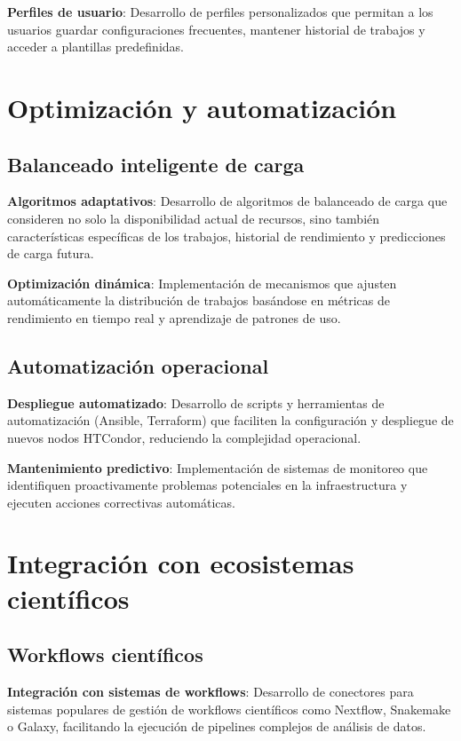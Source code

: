 \textbf{Perfiles de usuario}: Desarrollo de perfiles personalizados que permitan a los usuarios guardar configuraciones frecuentes, mantener historial de trabajos y acceder a plantillas predefinidas.

\section{Optimización y automatización}
\noindent

\subsection{Balanceado inteligente de carga}
\noindent

\textbf{Algoritmos adaptativos}: Desarrollo de algoritmos de balanceado de carga que consideren no solo la disponibilidad actual de recursos, sino también características específicas de los trabajos, historial de rendimiento y predicciones de carga futura.

\textbf{Optimización dinámica}: Implementación de mecanismos que ajusten automáticamente la distribución de trabajos basándose en métricas de rendimiento en tiempo real y aprendizaje de patrones de uso.

\subsection{Automatización operacional}
\noindent

\textbf{Despliegue automatizado}: Desarrollo de scripts y herramientas de automatización (Ansible, Terraform) que faciliten la configuración y despliegue de nuevos nodos HTCondor, reduciendo la complejidad operacional.

\textbf{Mantenimiento predictivo}: Implementación de sistemas de monitoreo que identifiquen proactivamente problemas potenciales en la infraestructura y ejecuten acciones correctivas automáticas.

\section{Integración con ecosistemas científicos}
\noindent

\subsection{Workflows científicos}
\noindent

\textbf{Integración con sistemas de workflows}: Desarrollo de conectores para sistemas populares de gestión de workflows científicos como Nextflow, Snakemake o Galaxy, facilitando la ejecución de pipelines complejos de análisis de datos.


